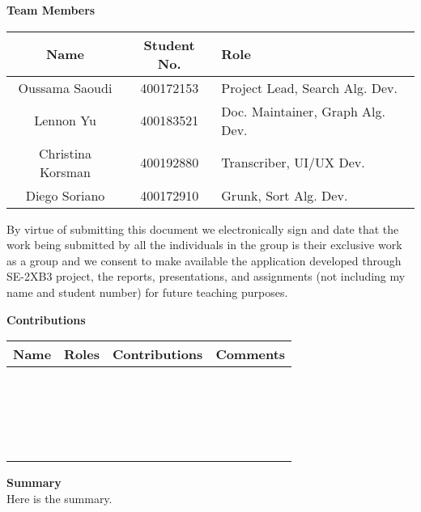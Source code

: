 \documentclass[12pt]{article}
\begin{document}
\Large \noindent \textbf{Team Members}\\
\normalsize
\begin{center}
    \begin{tabular}{|| c | c | l ||} 
    \hline
    Name & Student No. & Role\\
    \hline\hline
    Oussama Saoudi & 400172153 & Project Lead, Search Alg. Dev. \\ 
    \hline
    Lennon Yu & 400183521 & Doc. Maintainer, Graph Alg. Dev. \\
    \hline
    Christina Korsman & 400192880 & Transcriber, UI/UX Dev. \\
    \hline
    Diego Soriano & 400172910 & Grunk, Sort Alg. Dev. \\
    \hline
\end{tabular}
\end{center}
 
\normalsize
By virtue of submitting this document we electronically sign and date
that the work being submitted by all the individuals in the group is
their exclusive work as a group and we consent to make available the
application developed through SE-2XB3 project, the reports,
presentations, and assignments (not including my name and student number)
for future teaching purposes. 
 
\newpage
\Large \textbf{Contributions}
\normalsize
\begin{center}
    \begin{tabular}{|| c | c | l | p{7cm} ||} 
    \hline
    Name & Roles & Contributions & Comments\\
    \hline\hline
    ~ & ~ & ~ \\ 
    \hline
    ~ & ~ & ~ \\
    \hline
    ~ & ~ & ~ \\
    \hline
    ~ & ~ & ~ \\
    \hline
\end{tabular}
\end{center}
 
\newpage
\Large \noindent \textbf{Summary}\\
\normalsize
Here is the summary.
 
\newpage
\normalsize
\tableofcontents
\newpage
\end{document}
